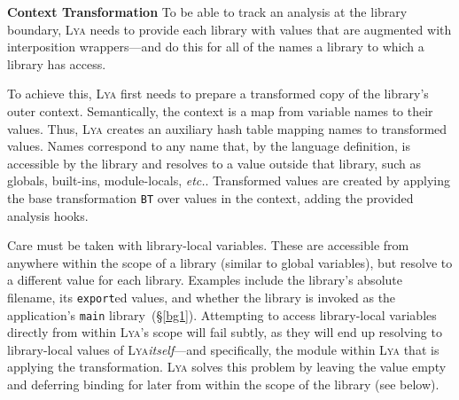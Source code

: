 \documentclass[letterpaper,twocolumn,10pt]{article}
\def\etc{{\em etc.}\xspace}
\newcommand{\heading}[1]{\vspace{2pt}\noindent\textbf{#1}\enspace}
\newcommand{\ttt}[1]{\texttt{#1}}
\newcommand{\sx}[1]{(\S\ref{#1})}
\newcommand{\sys}{{\scshape Lya}\xspace}
\begin{document}
\heading{Context Transformation}
To be able to track an analysis at the library boundary, \sys needs to provide each library with values that are augmented with interposition wrappers---and do this for all of the names a library to which a library has access.

To achieve this, \sys first needs to prepare a transformed copy of the library's outer context.
Semantically, the context is a map from variable names to their values.
Thus, \sys creates an auxiliary hash table mapping names to transformed values.
Names correspond to any name that, by the language definition, is accessible by the library and resolves to a value outside that library, such as globals, built-ins, module-locals, \etc.
Transformed values are created by applying the base transformation \ttt{BT} over values in the context, adding the provided analysis hooks.


Care must be taken with library-local variables. %
These are accessible from anywhere within the scope of a library (similar to global variables), but resolve to a different value for each library.
Examples include the library's absolute filename, its \ttt{export}ed values, and whether the library is invoked as the application's \ttt{main} library~\sx{bg1}.
Attempting to access library-local variables directly from within \sys's scope will fail subtly, as they will end up resolving to library-local values of \sys \emph{itself}---and specifically, the module within \sys that is applying the transformation.
\sys solves this problem by leaving the value empty and deferring binding for later from within the scope of the library (see below).
\end{document}
